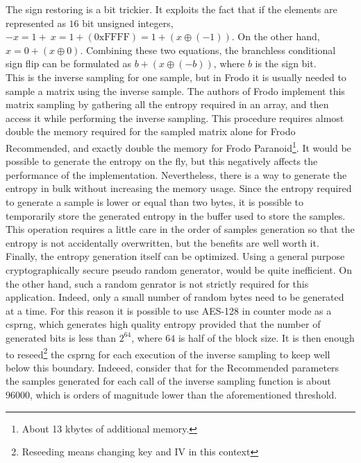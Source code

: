 The sign restoring is a bit trickier. It exploits the fact that if the elements are represented as $16$ bit unsigned integers, $-x=1+~x=1+(\text{0xFFFF})=1+(x\oplus(-1))$. On the other hand,$x=0+(x\oplus0)$. Combining these two equations, the branchless conditional sign flip can be formulated as $b+(x\oplus(-b))$, where $b$ is the sign bit.\\
This is the inverse sampling for one sample, but in Frodo it is usually needed to sample a matrix using the inverse sample. The authors of Frodo implement this matrix sampling by gathering all the entropy required in an array, and then access it while performing the inverse sampling. This procedure requires almost double the memory required for the sampled matrix alone for Frodo Recommended, and exactly double the memory for Frodo Paranoid\footnote{About 13 kbytes of additional memory.}. It would be possible to generate the entropy on the fly, but this negatively affects the performance of the implementation. Nevertheless, there is a way to generate the entropy in bulk without increasing the memory usage. Since the entropy required to generate a sample is lower or equal than two bytes, it is possible to temporarily store the generated entropy in the buffer used to store the samples. This operation requires a little care in the order of samples generation so that the entropy is not accidentally overwritten, but the benefits are well worth it.\\
Finally, the entropy generation itself can be optimized. Using a general purpose cryptographically secure pseudo random generator, would be quite inefficient. On the other hand, such a random genrator is not strictly required for this application. Indeed, only a small number of random bytes need to be generated at a time. For this reason it is possible to use AES-128 in counter mode as a csprng, which generates high quality entropy provided that the number of generated bits is less than $2^{64}$, where $64$ is half of the block size. It is then enough to reseed\footnote{Reseeding means changing key and IV in this context} the csprng for each execution of the inverse sampling to keep well below this boundary. Indeeed, consider that for the Recommended parameters the samples generated for each call of the inverse sampling function is about $96000$, which is orders of magnitude lower than the aforementioned threshold. 

